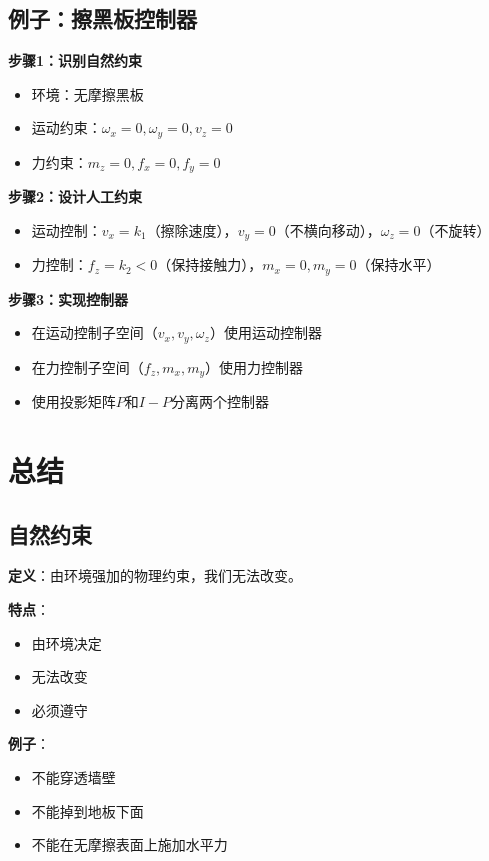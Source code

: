 \documentclass[12pt,a4paper]{article}
\begin{document}
\subsection{例子：擦黑板控制器}

\textbf{步骤1：识别自然约束}
\begin{itemize}
\item 环境：无摩擦黑板
\item 运动约束：$\omega_x = 0, \omega_y = 0, v_z = 0$
\item 力约束：$m_z = 0, f_x = 0, f_y = 0$
\end{itemize}

\textbf{步骤2：设计人工约束}
\begin{itemize}
\item 运动控制：$v_x = k_1$（擦除速度），$v_y = 0$（不横向移动），$\omega_z = 0$（不旋转）
\item 力控制：$f_z = k_2 < 0$（保持接触力），$m_x = 0, m_y = 0$（保持水平）
\end{itemize}

\textbf{步骤3：实现控制器}
\begin{itemize}
\item 在运动控制子空间（$v_x, v_y, \omega_z$）使用运动控制器
\item 在力控制子空间（$f_z, m_x, m_y$）使用力控制器
\item 使用投影矩阵$P$和$I-P$分离两个控制器
\end{itemize}

\section{总结}

\subsection{自然约束}

\textbf{定义}：由环境强加的物理约束，我们无法改变。

\textbf{特点}：
\begin{itemize}
\item 由环境决定
\item 无法改变
\item 必须遵守
\end{itemize}

\textbf{例子}：
\begin{itemize}
\item 不能穿透墙壁
\item 不能掉到地板下面
\item 不能在无摩擦表面上施加水平力
\end{itemize}
\end{document}
